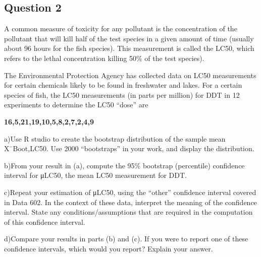 \documentclass[
]{article}
\begin{document}
\hypertarget{question-2}{%
\subsection{Question 2}\label{question-2}}

A common measure of toxicity for any pollutant is the concentration of
the pollutant that will kill half of the test species in a given amount
of time (usually about 96 hours for the fish species). This measurement
is called the LC50, which refers to the lethal concentration killing
50\% of the test species).

The Environmental Protection Agency has collected data on LC50
measurements for certain chemicals likely to be found in freshwater and
lakes. For a certain species of fish, the LC50 measurements (in parts
per million) for DDT in 12 experiments to determine the LC50 ``dose''
are

\textbf{16,5,21,19,10,5,8,2,7,2,4,9}

a)Use R studio to create the bootstrap distribution of the sample mean
X¯Boot,LC50. Use 2000 ``bootstraps'' in your work, and display the
distribution.

b)From your result in (a), compute the 95\% bootstrap (percentile)
confidence interval for μLC50, the mean LC50 measurement for DDT.

c)Repeat your estimation of μLC50, using the ``other'' confidence
interval covered in Data 602. In the context of these data, interpret
the meaning of the confidence interval. State any conditions/assumptions
that are required in the computation of this confidence interval.

d)Compare your results in parts (b) and (c). If you were to report one
of these confidence intervals, which would you report? Explain your
answer.
\end{document}
